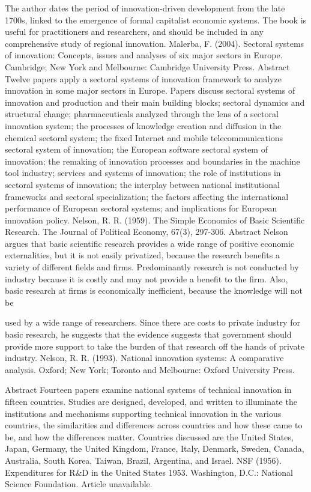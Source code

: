\documentclass[a4paper,11pt]{article}
\begin{document}
The author dates the period of innovation-driven development from the late 1700s, linked to the emergence of formal capitalist economic systems. The book is useful for practitioners and researchers, and should be included in any comprehensive study of regional innovation.
Malerba, F. (2004). Sectoral systems of innovation: Concepts, issues and analyses of six major sectors in Europe. Cambridge; New York and Melbourne: Cambridge University Press.
Abstract
Twelve papers apply a sectoral systems of innovation framework to analyze innovation in some major sectors in Europe. Papers discuss sectoral systems of innovation and production and their main building blocks; sectoral dynamics and structural change; pharmaceuticals analyzed through the lens of a sectoral innovation system; the processes of knowledge creation and diffusion in the chemical sectoral system; the fixed Internet and mobile telecommunications sectoral system of innovation; the European software sectoral system of innovation; the remaking of innovation processes and boundaries in the machine tool industry; services and systems of innovation; the role of institutions in sectoral systems of innovation; the interplay between national institutional frameworks and sectoral specialization; the factors affecting the international performance of European sectoral systems; and implications for European innovation policy.
Nelson, R. R. (1959). The Simple Economics of Basic Scientific Research. The Journal of Political Economy, 67(3), 297-306.
Abstract
Nelson argues that basic scientific research provides a wide range of positive economic externalities, but it is not easily privatized, because the research benefits a variety of different fields and firms. Predominantly research is not conducted by industry because it is costly and may not provide a benefit to the firm. Also, basic research at firms is economically inefficient, because the knowledge will not be
 


used by a wide range of researchers. Since there are costs to private industry for basic research, he suggests that the evidence suggests that government should provide more support to take the burden of that research off the hands of private industry.
Nelson, R. R. (1993). National innovation systems: A comparative analysis. Oxford; New York; Toronto and Melbourne: Oxford University Press.

Abstract
Fourteen papers examine national systems of technical innovation in fifteen countries. Studies are designed, developed, and written to illuminate the institutions and mechanisms supporting technical innovation in the various countries, the similarities and differences across countries and how these came to be, and how the differences matter. Countries discussed are the United States, Japan, Germany, the United Kingdom, France, Italy, Denmark, Sweden, Canada, Australia, South Korea, Taiwan, Brazil, Argentina, and Israel.
NSF (1956). Expenditures for R&D in the United States 1953. Washington, D.C.: National Science Foundation.
Article unavailable.
\end{document}
